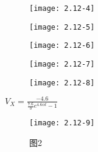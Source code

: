 \begin{figure}[H] %
	\begin{minipage}{\linewidth}
		\texttt{[image: 2.12-4]}
	\end{minipage}
\end{figure}

\begin{figure}[H] %
	\begin{minipage}{\linewidth}
		\texttt{[image: 2.12-5]}
	\end{minipage}
\end{figure}

\begin{figure}[H] %
	\begin{minipage}{\linewidth}
		\texttt{[image: 2.12-6]}
	\end{minipage}
\end{figure}

\begin{figure}[H] %
	\begin{minipage}{\linewidth}
		\texttt{[image: 2.12-7]}
	\end{minipage}
\end{figure}

\begin{figure}[H] %
	\begin{minipage}{\linewidth}
		\texttt{[image: 2.12-8]}
	\end{minipage}
\end{figure}


$V_X=\frac{-4.6}{\frac{7.6}{3}e^{4.6 \alpha t}-1}$

\begin{figure}[H] %
	\begin{minipage}{\linewidth}
		\texttt{[image: 2.12-9]}
	\end{minipage}
	\caption*{图2} %
\end{figure}

\color{black}{}

